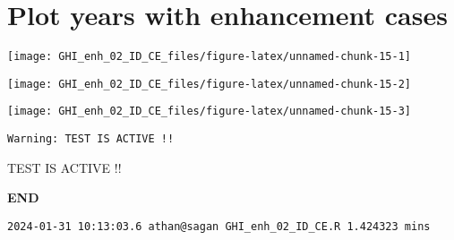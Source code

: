 \documentclass[
  10pt,
  a4paper,oneside]{article}
\begin{document}
\newpage
\FloatBarrier

\hypertarget{plot-years-with-enhancement-cases}{%
\section{Plot years with enhancement cases}\label{plot-years-with-enhancement-cases}}

\begin{center}\texttt{[image: GHI\_enh\_02\_ID\_CE\_files/figure-latex/unnamed-chunk-15-1]} \end{center}

\begin{center}\texttt{[image: GHI\_enh\_02\_ID\_CE\_files/figure-latex/unnamed-chunk-15-2]} \end{center}

\begin{center}\texttt{[image: GHI\_enh\_02\_ID\_CE\_files/figure-latex/unnamed-chunk-15-3]} \end{center}

\begin{verbatim}
Warning: TEST IS ACTIVE !!
\end{verbatim}

TEST IS ACTIVE !!

\textbf{END}

\begin{verbatim}
2024-01-31 10:13:03.6 athan@sagan GHI_enh_02_ID_CE.R 1.424323 mins
\end{verbatim}
\end{document}
